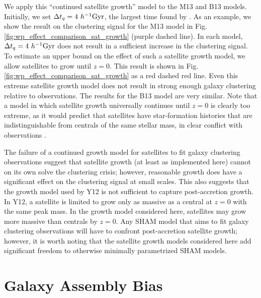 \documentclass[useAMS,fleqn,usenatbib]{mnras}
\begin{document}
We apply this ``continued satellite growth'' model to the M13 and B13 models.  Initially, we set $\Delta t_{q}=4 ~h^{-1}{\rm Gyr}$, the largest time found by \citet{Wetzel:2013dw}.  As an example, we show the result on the clustering signal for the M13 model in Fig. \ref{fig:wp_effect_comparison_sat_growth} (purple dashed line).  In each model, $\Delta t_{q}=4 ~h^{-1}{\rm Gyr}$ does not result in a sufficient increase in the clustering signal.  To estimate an upper bound on the effect of such a satellite growth model, we allow satellites to grow until $z=0$.  This result is shown in Fig. \ref{fig:wp_effect_comparison_sat_growth} as a red dashed red line.  Even this extreme satellite growth model does not result in strong enough galaxy clustering relative to observations.  The results for the B13 model are very similar. Note that a model in which satellite growth universally continues until $z=0$ is clearly too extreme, as it would predict that satellites have star-formation histories that are indistinguishable from centrals of the same stellar mass, in clear conflict with observations \citep[e.g.][]{Weinmann:2006hu, vandenBosch:2008fv, Wetzel:2012lk, Wetzel:2013dw, Kawinwanichakij:2015tu}.

The failure of a continued growth model for satellites to fit galaxy clustering observations suggest that satellite growth (at least as implemented here) cannot on its own solve the clustering crisis; however, reasonable growth does have a significant effect on the clustering signal at small scales.  This also suggests that the growth model used by Y12 is not sufficient to capture post-accretion growth.  In Y12, a satellite is limited to grow only as massive as a central at $z=0$ with the same peak mass.  In the growth model considered here, satellites may grow more massive than centrals by $z=0$. Any SHAM model that aims to fit galaxy clustering observations will have to confront post-accretion satellite growth; however, it is worth noting that the satellite growth models considered here add significant freedom to otherwise minimally parametrized SHAM models.


\section{Galaxy Assembly Bias}
\label{sec:assem_bias} 
\end{document}
